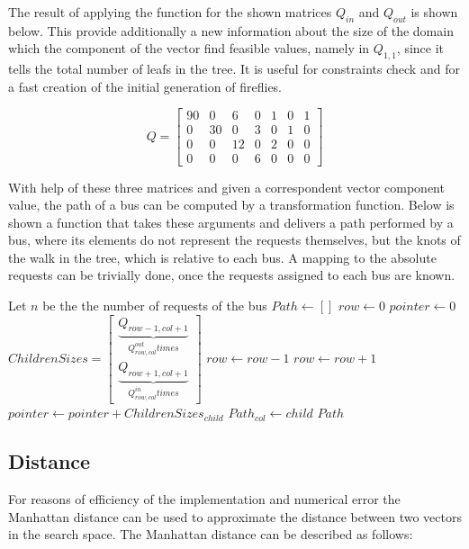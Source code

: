 \documentclass[tuberlin,cic,tc,openright,english,noabntcite]{iiufrgs}
\begin{document}
The result of applying the function for the shown matrices $Q_{in}$ and $Q_{out}$ is shown below. This provide additionally a new information about the size of the domain which the component of the vector find feasible values, namely in $Q_{1,1}$, since it tells the total number of leafs in the tree. It is useful for constraints check and for a fast creation of the initial generation of fireflies.

$$
Q = 
\begin{bmatrix}
90 & 0 & 6 & 0 & 1 & 0 & 1\\
0 & 30 & 0 & 3 & 0 & 1 & 0\\
0 & 0 & 12 & 0 & 2 & 0 & 0\\
0 & 0 & 0 & 6 & 0 & 0 & 0
\end{bmatrix}
$$

With help of these three matrices and given a correspondent vector component value, the path of a bus can be computed by a transformation function. Below is shown a function that takes these arguments and delivers a path performed by a bus, where its elements do not represent the requests themselves, but the knots of the walk in the tree, which is relative to each bus. A mapping to the absolute requests can be trivially done, once the requests assigned to each bus are known.

\begin{algorithmic}
\State Let $n$ be the the number of requests of the bus
\State $Path \gets [ ]$
\State $row \gets 0$
\State $pointer \gets 0$
	\State $\displaystyle ChildrenSizes = \begin{bmatrix}\underbrace{Q_{row-1,col+1}}_{Q^{out}_{row,col} times}
			\\ \underbrace{Q_{row+1,col+1}}_{Q^{in}_{row,col} times}\end{bmatrix}$
				\State $row \gets row - 1$
			\Else
				\State $row \gets row + 1$
			\EndIf
		\Else
			\State $pointer \gets pointer + ChildrenSizes_{child}$
		\EndIf
	\EndFor
	\State $Path_{col} \gets child$
\EndFor
\State \Return $Path$
\EndFunction
\end{algorithmic}

\subsection{Distance}
For reasons of efficiency of the implementation and numerical error the Manhattan distance can be used to approximate the distance between two vectors in the search space. The Manhattan distance can be described as follows:
\end{document}

